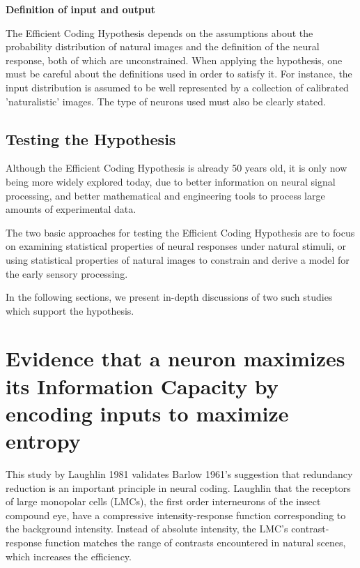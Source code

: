 \documentclass[twoside]{article}
\begin{document}
\begin{multicols}{2}
\noindent\textbf{Definition of input and output}

The Efficient Coding Hypothesis depends on the assumptions about the probability distribution of natural images and the definition of the neural response, both of which are unconstrained. When applying the hypothesis, one must be careful about the definitions used in order to satisfy it. For instance, the input distribution is assumed to be well represented by a collection of calibrated 'naturalistic' images. The type of neurons used must also be clearly stated.

\subsection{Testing the Hypothesis}

Although the Efficient Coding Hypothesis is already 50 years old, it is only now being more widely explored today, due to better information on neural signal processing, and better mathematical and engineering tools to process large amounts of experimental data.

The two basic approaches for testing the Efficient Coding Hypothesis are to focus on examining statistical properties of neural responses under natural stimuli, or using statistical properties of natural images to constrain and derive a model for the early sensory processing.

In the following sections, we present in-depth discussions of two such studies which support the hypothesis. 













\section{Evidence that a neuron maximizes its Information Capacity by encoding inputs to maximize entropy}

This study by Laughlin 1981 validates Barlow 1961's suggestion that redundancy reduction is an important principle in neural coding. Laughlin that the receptors of large monopolar cells (LMCs), the first order interneurons of the insect compound eye, have a compressive intensity-response function corresponding to the background intensity. Instead of absolute intensity, the LMC's contrast-response function matches the range of contrasts encountered in natural scenes, which increases the efficiency.


\end{multicols}
\end{document}
